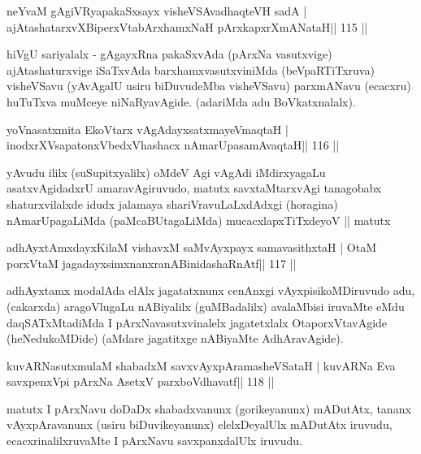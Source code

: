 
\begin{shl}
neYvaM gAgiVRyapakaSxsayx visheVSAvadhaqteVH sadA |
ajAtashatarxvXBiperxVtabArxhamxNaH pArxkapxrXmANataH\hfill || 115 ||
\end{shl}

\begin{artha}
hiVgU sariyalalx - gAgayxRna pakaSxvAda (pArxNa vasutxvige) ajAtashaturxvige iSaTx\-vAda barxhamxvasutxviniMda (beVpaRTiTxruva) visheVSavu (yAvAgalU usiru biDuvu\-deMba visheVSavu) parxmANavu (ecacxru) huTuTxva muMceye niNaRyavAgide. (adariMda adu BoVkatxnalalx).
\end{artha}


\begin{shl}
yoV\s nasatxmita EkoV\s tarx vAgAdayxsatxmayeV\s maqtaH |
inodxrXV\s sapatonxV\s bedxVhashacx nAmarUpasamAvaqtaH\hfill || 116 ||
\end{shl}

\begin{artha}
yAvudu ililx (suSupitxyalilx) oMdeV Agi vAgAdi iMdirxyagaLu asatx\-vAgidadxrU amaravAgiruvudo, matutx savxtaMtarxvAgi tanagobabx shaturxvilalxde idudx jalamaya shariVravuLaLxdAdxgi (horagina) nAmarUpagaLiMda (paMcaBUtagaLiMda) mucacxlapxTiTxdeyoV || matutx
\end{artha}

\begin{shl}
adhAyxtAmxdayxKilaM vishavxM saMvAyxpayx samavasithxtaH |
OtaM porxVtaM jagadayxsimxnanxranABinidashaRnAtf\hfill || 117 ||
\end{shl}

\begin{artha}
adhAyxtamx modalAda elAlx jagatatxnunx cenAnxgi vAyxpisikoMDiruvudo  adu, (cakarxda) aragoVlugaLu nABiyalilx (guMBadalilx) avalaMbisi  iruvaMte eMdu daqSATxMtadiMda I pArxNavasutxvinalelx jagatetxlalx OtaporxVtavAgide (heNedukoMDide) (aMdare jagatitxge nABiyaMte AdhAravAgide).  
\end{artha}

\begin{shl}
kuvARNasutxmulaM shabadxM savxvAyxpAramasheVSataH |
kuvARNa Eva savxpenxV\s pi pArxNa AsetxV parxboVdhavatf\hfill || 118 ||
\end{shl}

\begin{artha}
matutx I pArxNavu doDaDx shabadxvanunx (gorikeyanunx) mADutAtx, tananx vAyxpAravanunx (usiru biDuvikeyanunx) elelxDeyalUlx mADutAtx iruvudu, ecacxrinalilxruvaMte I pArxNavu savxpanxdalUlx iruvudu.
\end{artha}

